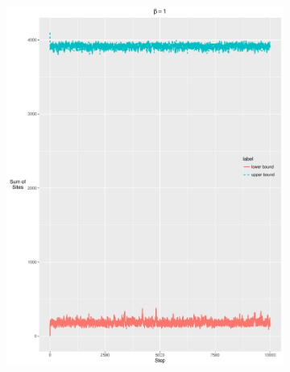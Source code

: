 \documentclass[12pt, oneside]{article}   	%
\begin{document}
\begin{figure}[H]
\begin{subfigure}[b]{0.475\textwidth}
            \includegraphics[width=\textwidth, height=0.5\textheight]{100.pdf}
        \end{subfigure} \\
\end{figure}
\end{document}
